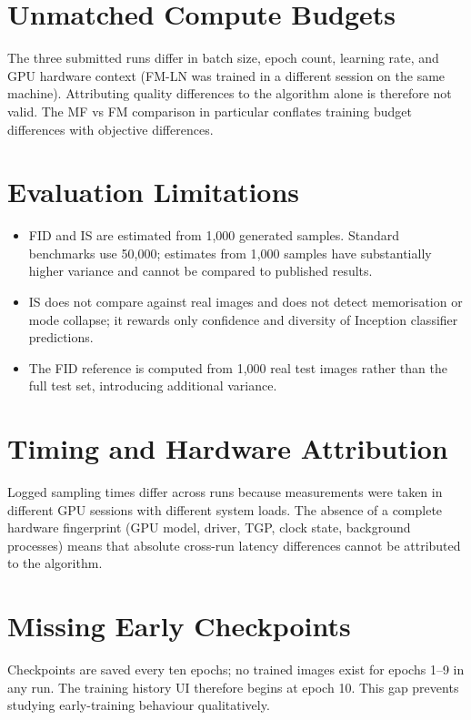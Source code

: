 \section{Unmatched Compute Budgets}

The three submitted runs differ in batch size, epoch count, learning rate, and
GPU hardware context (FM-LN was trained in a different session on the same
machine). Attributing quality differences to the algorithm alone is therefore
not valid. The MF vs FM comparison in particular conflates training budget
differences with objective differences.

\section{Evaluation Limitations}

\begin{itemize}
  \item FID and IS are estimated from 1{,}000 generated samples. Standard
        benchmarks use 50{,}000; estimates from 1{,}000 samples have substantially
        higher variance and cannot be compared to published results.
  \item IS does not compare against real images and does not detect memorisation
        or mode collapse; it rewards only confidence and diversity of Inception
        classifier predictions.
  \item The FID reference is computed from 1{,}000 real test images rather than
        the full test set, introducing additional variance.
\end{itemize}

\section{Timing and Hardware Attribution}

Logged sampling times differ across runs because measurements were taken in
different GPU sessions with different system loads. The absence of a complete
hardware fingerprint (GPU model, driver, TGP, clock state, background processes)
means that absolute cross-run latency differences cannot be attributed to the
algorithm.

\section{Missing Early Checkpoints}

Checkpoints are saved every ten epochs; no trained images exist for epochs 1--9
in any run. The training history UI therefore begins at epoch 10. This gap
prevents studying early-training behaviour qualitatively.

